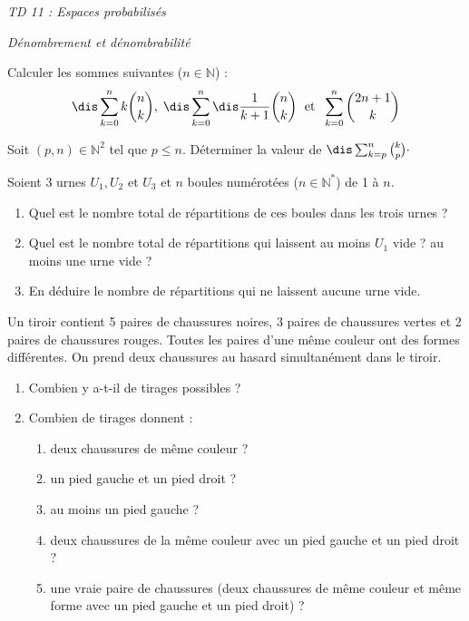 \documentclass[a4paper,10pt]{report}
\begin{document}
\everymath{\displaystyle}
\begin{center}
\textit{{ {\huge TD 11 : Espaces probabilisés}}}
\end{center}

\bigskip


\begin{center}
\textit{{ {\large Dénombrement et dénombrabilité}}}
\end{center}

\medskip

\begin{Exa} Calculer les sommes suivantes ($n \in \mathbb{N}$) : 
$$\dis\sum_{k=0}^n k \binom{n}{k}, \; \dis\sum_{k=0}^n\dis\frac{1}{k+1} \binom{n}{k} \; \hbox{ et } \; \sum_{k=0}^n \binom{2n+1}{k}$$
\end{Exa}

\begin{Exa} Soit $(p, n) \in \mathbb{N}^2$ tel que $p \leq n$. Déterminer la valeur de $\dis\sum_{k=p}^n{k\choose p} \cdot$

\end{Exa}


\begin{Exa}Soient $3$ urnes $U_1,U_2$ et $U_3$ et $n$ boules numérotées ($n \in \mathbb{N}^*$) de 1 à $n$.
\begin{enumerate}
\item Quel est le nombre total de répartitions de ces boules dans les trois urnes ?
\item Quel est le nombre total de répartitions qui laissent au moins $U_1$ vide ? au moins une urne vide ?
\item En déduire le nombre de répartitions qui ne laissent aucune urne vide.
\end{enumerate}
\end{Exa}



\begin{Exa} Un tiroir contient 5 paires de chaussures noires, 3 paires de chaussures vertes et 2 paires de chaussures rouges. Toutes les paires d'une même couleur ont des formes différentes. On prend deux chaussures au hasard simultanément dans le tiroir.
\begin{enumerate}
\item Combien y a-t-il de tirages possibles ?
\item 
Combien de tirages donnent :
\begin{enumerate}
\item deux chaussures de même couleur ?
\item un pied gauche et un pied droit ?
\item au moins un pied gauche ?
\item deux chaussures de la même couleur avec un pied gauche et un pied droit ?
\item une vraie paire de chaussures (deux chaussures de même couleur et même forme avec un pied gauche et un pied droit) ?
\end{enumerate}
\end{enumerate}
\end{Exa}
\end{document}
